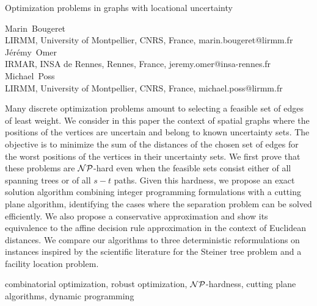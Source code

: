 \documentclass[12pt]{article}
\newcommand{\blue}[1]{{\color{black}#1}}
\begin{document}

\begin{center}

{\LARGE Optimization problems in graphs with locational uncertainty}\\[12pt]

\footnotesize

\mbox{\large Marin Bougeret}\\ LIRMM, University of Montpellier, CNRS, France, \mbox{marin.bougeret@lirmm.fr}\\[6pt]

\mbox{\large J\'er\'emy Omer}\\ IRMAR, INSA de Rennes, Rennes, France, \mbox{jeremy.omer@insa-rennes.fr}\\[6pt]

\mbox{\large Michael Poss}\\ LIRMM, University of Montpellier, CNRS, France, \mbox{michael.poss@lirmm.fr}\\[6pt]

\normalsize

\end{center}


\noindent
Many discrete optimization problems amount to selecting a feasible \blue{set of edges} of least weight. We consider in this paper the context of spatial graphs where the positions of the vertices are uncertain and belong to known uncertainty sets. The objective is to minimize the sum of the distances of the chosen \blue{set of edges} for the worst positions of the vertices in their uncertainty sets. We first prove that these problems are $\cal NP$-hard even when the feasible sets consist either of all spanning trees or of all $s-t$ paths. Given this hardness, we propose an exact solution algorithm combining integer programming formulations with a cutting plane algorithm, identifying the cases where the separation problem can be solved efficiently. We also propose a conservative approximation and show its equivalence to the affine decision rule approximation in the context of Euclidean distances. We compare our algorithms to three deterministic reformulations on instances inspired by the scientific literature for the Steiner tree problem and a facility location problem.

\bigskip

 combinatorial optimization, robust optimization, $\cal{NP}$-hardness, cutting plane algorithms, dynamic programming
\end{document}
